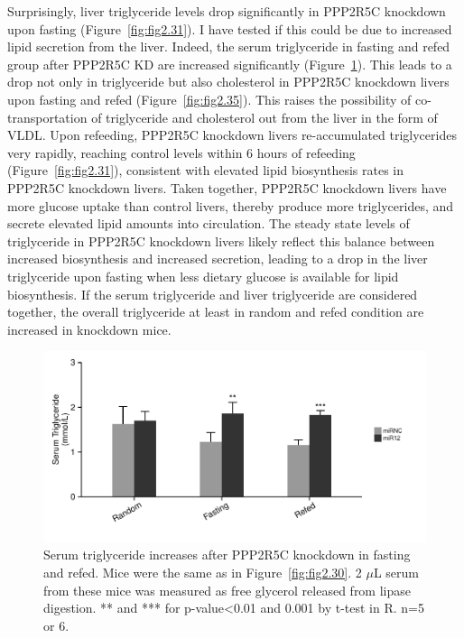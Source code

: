 Surprisingly, liver triglyceride levels drop significantly in PPP2R5C knockdown upon fasting (Figure~\ref{fig:fig2.31}). I have tested if this could be due to increased lipid secretion from the liver. Indeed, the serum triglyceride in fasting and refed group after PPP2R5C KD are increased significantly (Figure~\ref{fig:fig2.32}). This leads to a drop not only in triglyceride but also cholesterol in PPP2R5C knockdown livers upon fasting and refed (Figure~\ref{fig:fig2.35}). This raises the possibility of co-transportation of triglyceride and cholesterol out from the liver in the form of VLDL. Upon refeeding, PPP2R5C knockdown livers re-accumulated triglycerides very rapidly, reaching control levels within 6 hours of refeeding (Figure~\ref{fig:fig2.31}), consistent with elevated lipid biosynthesis rates in PPP2R5C knockdown livers. Taken together, PPP2R5C knockdown livers have more glucose uptake than control livers, thereby produce more triglycerides, and secrete elevated lipid amounts into circulation. The steady state levels of triglyceride in PPP2R5C knockdown livers likely reflect this balance between increased biosynthesis and increased secretion, leading to a drop in the liver triglyceride upon fasting when less dietary glucose is available for lipid biosynthesis. If the serum triglyceride and liver triglyceride are considered together, the overall triglyceride at least in random and refed condition are increased in knockdown mice.

\begin{figure}[htbp]
\centering
\includegraphics[width=1\textwidth]{figs/fig2-32 serum tag.pdf}
\caption[Serum triglyceride changes after PPP2R5C KD]{\footnotesize Serum triglyceride increases after PPP2R5C knockdown in fasting and refed. Mice were the same as in Figure~\ref{fig:fig2.30}. 2 $\mu$L serum from these mice was measured as free glycerol released from lipase digestion. ** and *** for p-value<0.01 and 0.001 by t-test in R. n=5 or 6.}
\label{fig:fig2.32}
\end{figure}

